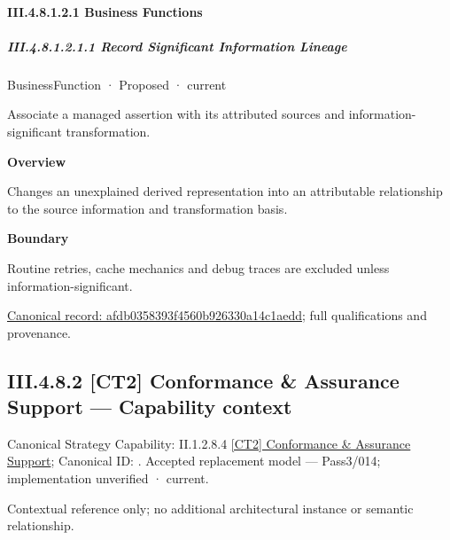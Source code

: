 \paragraph*{III.4.8.1.2.1 Business Functions}
\label{navigation:III.4.8.1.2.1}

\subparagraph*{III.4.8.1.2.1.1 Record Significant Information Lineage}
\label{navigation:III.4.8.1.2.1.1}

\label{element:afdb0358393f4560b926330a14c1aedd}
{\small BusinessFunction · Proposed · current}\par

Associate a managed assertion with its attributed sources and information-significant transformation.



\textbf{Overview}



Changes an unexplained derived representation into an attributable relationship to the source information and transformation basis.



\textbf{Boundary}



Routine retries, cache mechanics and debug traces are excluded unless information-significant.


{\footnotesize \href{../../../../continuum/business/business-function/afdb0358393f4560b926330a14c1aedd.md}{Canonical record: afdb0358393f4560b926330a14c1aedd}; full qualifications and provenance.}\par
\subsection*{III.4.8.2 [CT2] Conformance \& Assurance Support — Capability context}
\label{navigation:III.4.8.2}

{\small Canonical Strategy Capability: II.1.2.8.4 \hyperref[element:131791faa80f408b8d566c601edd71be]{[CT2] Conformance \& Assurance Support}; Canonical ID: \texttt{}. Accepted replacement model — Pass3/014; implementation unverified · current.}\par
Contextual reference only; no additional architectural instance or semantic relationship.\par
